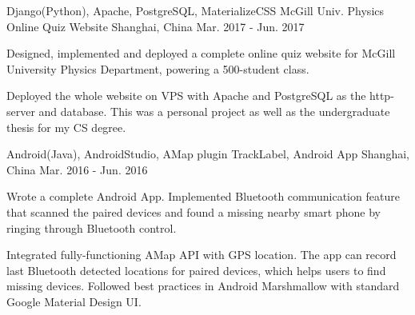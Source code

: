 


\begin{cventries}


\cventry
{Django(Python), Apache, PostgreSQL, MaterializeCSS} %
{McGill Univ. Physics Online Quiz Website} %
{Shanghai, China} %
{Mar. 2017 - Jun. 2017} %
{ %
\begin{cvitems}
\item {Designed, implemented and deployed a complete online quiz website for McGill University Physics Department, powering a 500-student class.}
\item {Deployed the whole website on VPS with Apache and PostgreSQL as the http-server and database. This was a personal project as well as the undergraduate thesis for my CS degree.}
\end{cvitems}
}


\cventry
{Android(Java), AndroidStudio, AMap plugin} %
{TrackLabel, Android App} %
{Shanghai, China} %
{Mar. 2016 - Jun. 2016} %
{ %
\begin{cvitems}
\item {Wrote a complete Android App. Implemented Bluetooth communication feature that scanned the paired devices and found a missing nearby smart phone by ringing through Bluetooth control.}
\item {Integrated fully-functioning AMap API with GPS location. The app can record last Bluetooth detected locations for paired devices, which helps users to find missing devices. Followed best practices in Android Marshmallow with standard Google Material Design UI.}
\end{cvitems}
}



\end{cventries}
